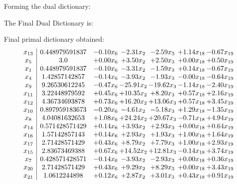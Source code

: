 \documentclass[8pt]{article}
\begin{document}
Forming the dual dictionary:

The Final Dual Dictionary is: 

 Final primal dictionary obtained: 
\[\begin{array}{c| c c@{\hskip 2pt} c@{\hskip 2pt} c@{\hskip 2pt} c@{\hskip 2pt} c@{\hskip 2pt} }
 x_{13}   &  0.448979591837 & -0.10 x_{6} & -2.31 x_{2} & -2.59 x_{3} & +  1.14 x_{18} & -0.67 x_{19}\\
 x_{5}   &  3.0 & +  0.00 x_{6} & +  3.50 x_{2} & +  2.50 x_{3} & +  0.00 x_{18} & +  0.50 x_{19}\\
 x_{1}   &  0.448979591837 & -0.10 x_{6} & -3.31 x_{2} & -1.59 x_{3} & +  0.14 x_{18} & -0.67 x_{19}\\
 x_{4}   &  1.42857142857 & -0.14 x_{6} & -3.93 x_{2} & -1.93 x_{3} & -0.00 x_{18} & -0.64 x_{19}\\
 x_{9}   &  9.26530612245 & -0.47 x_{6} & -25.91 x_{2} & -19.62 x_{3} & -1.14 x_{18} & -2.40 x_{19}\\
 x_{11}   &  3.22448979592 & +  0.45 x_{6} & + 10.35 x_{2} & +  8.20 x_{3} & +  0.57 x_{18} & +  2.16 x_{19}\\
 x_{12}   &  4.36734693878 & +  0.73 x_{6} & + 16.20 x_{2} & + 13.06 x_{3} & +  0.57 x_{18} & +  3.45 x_{19}\\
 x_{10}   &  0.897959183673 & -0.20 x_{6} & -4.61 x_{2} & -5.18 x_{3} & +  1.29 x_{18} & -1.35 x_{19}\\
 x_{8}   &  4.04081632653 & +  1.08 x_{6} & + 24.24 x_{2} & + 20.67 x_{3} & -0.71 x_{18} & +  4.94 x_{19}\\
 x_{14}   &  0.571428571429 & +  0.14 x_{6} & +  3.93 x_{2} & +  2.93 x_{3} & +  0.00 x_{18} & +  0.64 x_{19}\\
 x_{16}   &  1.57142857143 & +  0.14 x_{6} & +  2.93 x_{2} & +  1.93 x_{3} & +  1.00 x_{18} & +  1.64 x_{19}\\
 x_{17}   &  2.71428571429 & +  0.43 x_{6} & +  8.79 x_{2} & +  7.79 x_{3} & +  1.00 x_{18} & +  2.93 x_{19}\\
 x_{15}   &  2.83673469388 & +  0.67 x_{6} & + 14.52 x_{2} & + 12.81 x_{3} & -0.14 x_{18} & +  3.74 x_{19}\\
 x_{7}   &  0.428571428571 & -0.14 x_{6} & -3.93 x_{2} & -2.93 x_{3} & +  0.00 x_{18} & +  0.36 x_{19}\\
 x_{20}   &  2.71428571429 & +  0.43 x_{6} & +  9.29 x_{2} & +  8.29 x_{3} & +  0.00 x_{18} & +  3.43 x_{19}\\
 x_{21}   &  1.0612244898 & +  0.12 x_{6} & +  2.87 x_{2} & +  3.01 x_{3} & +  0.43 x_{18} & +  0.91 x_{19}\\

\end{array}\]
\end{document}
